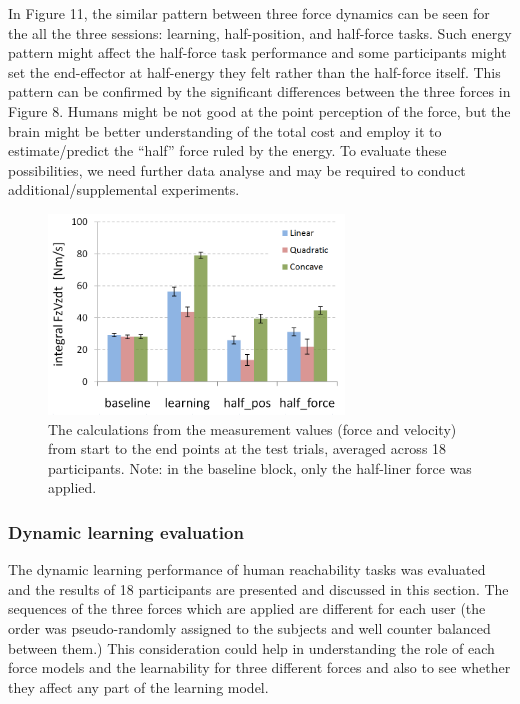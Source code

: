 In Figure 11, the similar pattern between three force dynamics can be seen for the all the three sessions: learning, half-position, and half-force tasks. Such energy pattern might affect the half-force task performance and some participants might set the end-effector at half-energy they felt rather than the half-force itself. This pattern can be confirmed by the significant differences between the three forces in Figure 8. Humans might be not good at the point perception of the force, but the brain might be better understanding of the total cost and employ it to estimate/predict the “half” force ruled by the energy. To evaluate these possibilities, we need further data analyse and may be required to conduct additional/supplemental experiments.
%
\begin{figure}
	\centering
	\includegraphics[width=0.7\textwidth]{Chie/figs/Figure11.png}
	\caption{The calculations from the measurement values (force and velocity) from start to the end points at the test trials, averaged across 18 participants.  Note: in the baseline block, only the half-liner force was applied.}
	\label{forcevel}
\end{figure}

\subsubsection{Dynamic learning evaluation}
The dynamic learning performance of human reachability tasks was evaluated and the results of 18 participants are presented and discussed in this section. The sequences of the three forces which are applied are different for each user (the order was pseudo-randomly assigned to the subjects and well counter balanced between them.) This consideration could help in understanding the role of each force models and the learnability for three different forces and also to see whether they affect any part of the learning model.


